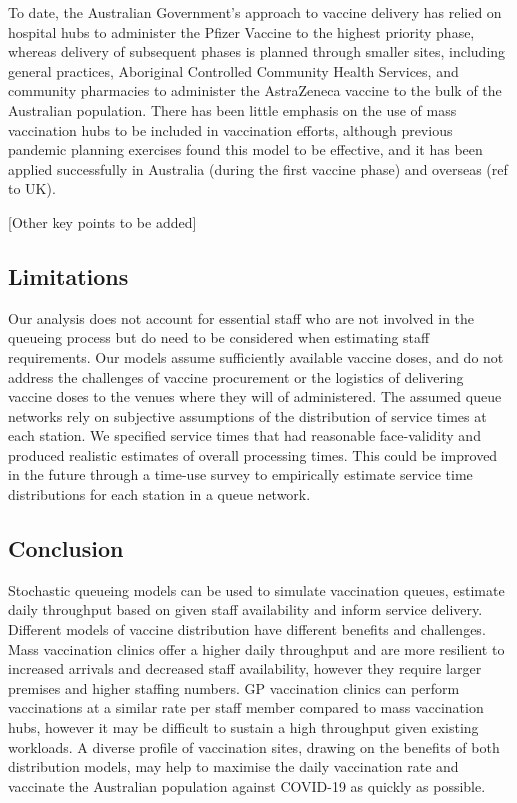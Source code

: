 \documentclass{article}
\begin{document}
To date, the Australian Government's approach to vaccine delivery has
relied on hospital hubs to administer the Pfizer Vaccine to the highest
priority phase, whereas delivery of subsequent phases is planned through
smaller sites, including general practices, Aboriginal Controlled
Community Health Services, and community pharmacies to administer the
AstraZeneca vaccine to the bulk of the Australian population. There has
been little emphasis on the use of mass vaccination hubs to be included
in vaccination efforts, although previous pandemic planning exercises
found this model to be effective, and it has been applied successfully
in Australia (during the first vaccine phase) and overseas (ref to UK).

{[}Other key points to be added{]}

\hypertarget{limitations}{%
\subsection{Limitations}\label{limitations}}

Our analysis does not account for essential staff who are not involved
in the queueing process but do need to be considered when estimating
staff requirements. Our models assume sufficiently available vaccine
doses, and do not address the challenges of vaccine procurement or the
logistics of delivering vaccine doses to the venues where they will of
administered. The assumed queue networks rely on subjective assumptions
of the distribution of service times at each station. We specified
service times that had reasonable face-validity and produced realistic
estimates of overall processing times. This could be improved in the
future through a time-use survey to empirically estimate service time
distributions for each station in a queue network.

\hypertarget{conclusion}{%
\subsection{Conclusion}\label{conclusion}}

Stochastic queueing models can be used to simulate vaccination queues,
estimate daily throughput based on given staff availability and inform
service delivery. Different models of vaccine distribution have
different benefits and challenges. Mass vaccination clinics offer a
higher daily throughput and are more resilient to increased arrivals and
decreased staff availability, however they require larger premises and
higher staffing numbers. GP vaccination clinics can perform vaccinations
at a similar rate per staff member compared to mass vaccination hubs,
however it may be difficult to sustain a high throughput given existing
workloads. A diverse profile of vaccination sites, drawing on the
benefits of both distribution models, may help to maximise the daily
vaccination rate and vaccinate the Australian population against
COVID-19 as quickly as possible.
\end{document}
